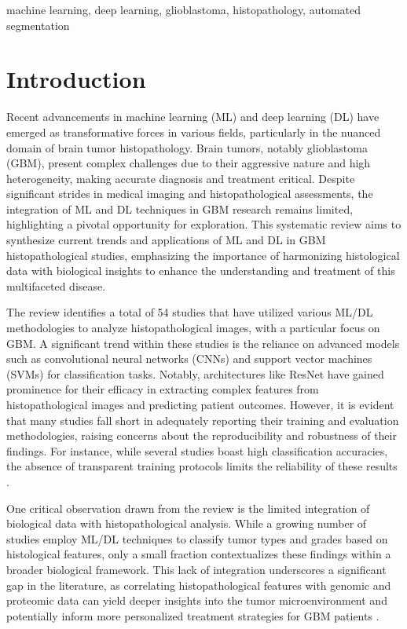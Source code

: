 \documentclass[runningheads]{llncs}
\begin{document}
\begin{keywords}
machine learning, deep learning, glioblastoma, histopathology, automated segmentation
\end{keywords}

\section{Introduction}
Recent advancements in machine learning (ML) and deep learning (DL) have emerged as transformative forces in various fields, particularly in the nuanced domain of brain tumor histopathology. Brain tumors, notably glioblastoma (GBM), present complex challenges due to their aggressive nature and high heterogeneity, making accurate diagnosis and treatment critical. Despite significant strides in medical imaging and histopathological assessments, the integration of ML and DL techniques in GBM research remains limited, highlighting a pivotal opportunity for exploration. This systematic review aims to synthesize current trends and applications of ML and DL in GBM histopathological studies, emphasizing the importance of harmonizing histological data with biological insights to enhance the understanding and treatment of this multifaceted disease.

The review identifies a total of 54 studies that have utilized various ML/DL methodologies to analyze histopathological images, with a particular focus on GBM. A significant trend within these studies is the reliance on advanced models such as convolutional neural networks (CNNs) and support vector machines (SVMs) for classification tasks. Notably, architectures like ResNet have gained prominence for their efficacy in extracting complex features from histopathological images and predicting patient outcomes. However, it is evident that many studies fall short in adequately reporting their training and evaluation methodologies, raising concerns about the reproducibility and robustness of their findings. For instance, while several studies boast high classification accuracies, the absence of transparent training protocols limits the reliability of these results \cite{Chun_2025}.

One critical observation drawn from the review is the limited integration of biological data with histopathological analysis. While a growing number of studies employ ML/DL techniques to classify tumor types and grades based on histological features, only a small fraction contextualizes these findings within a broader biological framework. This lack of integration underscores a significant gap in the literature, as correlating histopathological features with genomic and proteomic data can yield deeper insights into the tumor microenvironment and potentially inform more personalized treatment strategies for GBM patients \cite{Chun_2025}. 
\end{document}
